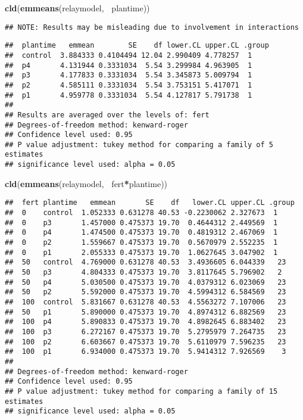 \documentclass[]{book}
\newenvironment{Shaded}{\begin{snugshade}}{\end{snugshade}}
\newcommand{\KeywordTok}[1]{\textcolor[rgb]{0.13,0.29,0.53}{\textbf{#1}}}
\newcommand{\OperatorTok}[1]{\textcolor[rgb]{0.81,0.36,0.00}{\textbf{#1}}}
\newcommand{\NormalTok}[1]{#1}
\theoremstyle{definition}
\theoremstyle{definition}
\theoremstyle{definition}
\theoremstyle{remark}
\begin{document}
\begin{Shaded}
\begin{Highlighting}[]
\KeywordTok{cld}\NormalTok{(}\KeywordTok{emmeans}\NormalTok{(relaymodel, }\OperatorTok{~}\NormalTok{plantime))}
\end{Highlighting}
\end{Shaded}

\begin{verbatim}
## NOTE: Results may be misleading due to involvement in interactions
\end{verbatim}

\begin{verbatim}
##  plantime   emmean        SE    df lower.CL upper.CL .group
##  control  3.884333 0.4104494 12.04 2.990409 4.778257  1    
##  p4       4.131944 0.3331034  5.54 3.299984 4.963905  1    
##  p3       4.177833 0.3331034  5.54 3.345873 5.009794  1    
##  p2       4.585111 0.3331034  5.54 3.753151 5.417071  1    
##  p1       4.959778 0.3331034  5.54 4.127817 5.791738  1    
## 
## Results are averaged over the levels of: fert 
## Degrees-of-freedom method: kenward-roger 
## Confidence level used: 0.95 
## P value adjustment: tukey method for comparing a family of 5 estimates 
## significance level used: alpha = 0.05
\end{verbatim}

\begin{Shaded}
\begin{Highlighting}[]
\KeywordTok{cld}\NormalTok{(}\KeywordTok{emmeans}\NormalTok{(relaymodel, }\OperatorTok{~}\NormalTok{fert}\OperatorTok{*}\NormalTok{plantime))}
\end{Highlighting}
\end{Shaded}

\begin{verbatim}
##  fert plantime   emmean       SE    df   lower.CL upper.CL .group
##  0    control  1.052333 0.631278 40.53 -0.2230062 2.327673  1    
##  0    p3       1.457000 0.475373 19.70  0.4644312 2.449569  1    
##  0    p4       1.474500 0.475373 19.70  0.4819312 2.467069  1    
##  0    p2       1.559667 0.475373 19.70  0.5670979 2.552235  1    
##  0    p1       2.055333 0.475373 19.70  1.0627645 3.047902  1    
##  50   control  4.769000 0.631278 40.53  3.4936605 6.044339   23  
##  50   p3       4.804333 0.475373 19.70  3.8117645 5.796902   2   
##  50   p4       5.030500 0.475373 19.70  4.0379312 6.023069   23  
##  50   p2       5.592000 0.475373 19.70  4.5994312 6.584569   23  
##  100  control  5.831667 0.631278 40.53  4.5563272 7.107006   23  
##  50   p1       5.890000 0.475373 19.70  4.8974312 6.882569   23  
##  100  p4       5.890833 0.475373 19.70  4.8982645 6.883402   23  
##  100  p3       6.272167 0.475373 19.70  5.2795979 7.264735   23  
##  100  p2       6.603667 0.475373 19.70  5.6110979 7.596235   23  
##  100  p1       6.934000 0.475373 19.70  5.9414312 7.926569    3  
## 
## Degrees-of-freedom method: kenward-roger 
## Confidence level used: 0.95 
## P value adjustment: tukey method for comparing a family of 15 estimates 
## significance level used: alpha = 0.05
\end{verbatim}
\end{document}
